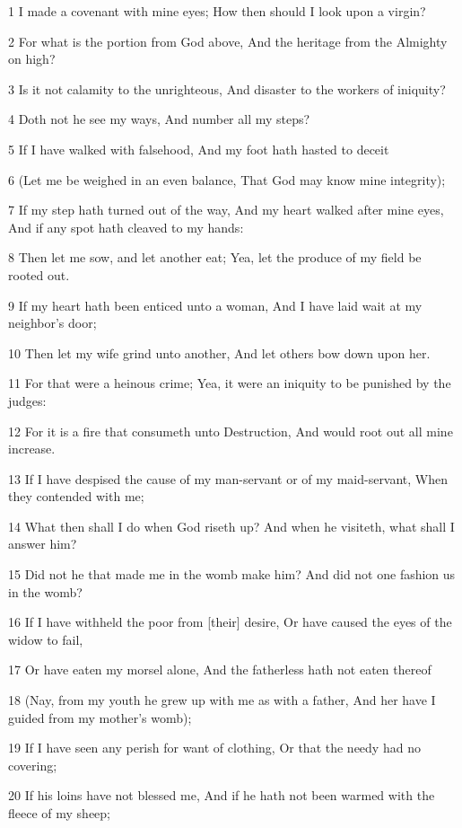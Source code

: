 \par 1 I made a covenant with mine eyes; How then should I look upon a virgin?
\par 2 For what is the portion from God above, And the heritage from the Almighty on high?
\par 3 Is it not calamity to the unrighteous, And disaster to the workers of iniquity?
\par 4 Doth not he see my ways, And number all my steps?
\par 5 If I have walked with falsehood, And my foot hath hasted to deceit
\par 6 (Let me be weighed in an even balance, That God may know mine integrity);
\par 7 If my step hath turned out of the way, And my heart walked after mine eyes, And if any spot hath cleaved to my hands:
\par 8 Then let me sow, and let another eat; Yea, let the produce of my field be rooted out.
\par 9 If my heart hath been enticed unto a woman, And I have laid wait at my neighbor's door;
\par 10 Then let my wife grind unto another, And let others bow down upon her.
\par 11 For that were a heinous crime; Yea, it were an iniquity to be punished by the judges:
\par 12 For it is a fire that consumeth unto Destruction, And would root out all mine increase.
\par 13 If I have despised the cause of my man-servant or of my maid-servant, When they contended with me;
\par 14 What then shall I do when God riseth up? And when he visiteth, what shall I answer him?
\par 15 Did not he that made me in the womb make him? And did not one fashion us in the womb?
\par 16 If I have withheld the poor from [their] desire, Or have caused the eyes of the widow to fail,
\par 17 Or have eaten my morsel alone, And the fatherless hath not eaten thereof
\par 18 (Nay, from my youth he grew up with me as with a father, And her have I guided from my mother's womb);
\par 19 If I have seen any perish for want of clothing, Or that the needy had no covering;
\par 20 If his loins have not blessed me, And if he hath not been warmed with the fleece of my sheep;
